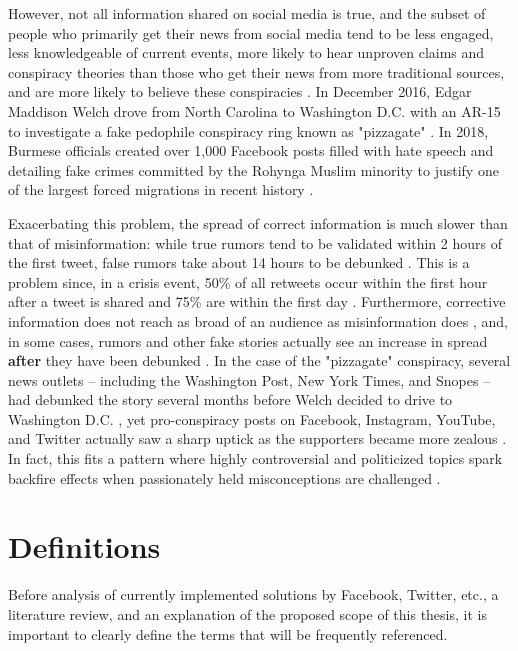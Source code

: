 \documentclass[NETN,manuscript]{stjour-new}
\begin{document}
However, not all information shared on social media is true, and the subset of people who primarily get their news from social media tend to be less engaged, less knowledgeable of current events, more likely to hear unproven claims and conspiracy theories than those who get their news from more traditional sources, and are more likely to believe these conspiracies \citep{mitchell2020americans}. In December 2016, Edgar Maddison Welch drove from North Carolina to Washington D.C. with an AR-15 to investigate a fake pedophile conspiracy ring known as "pizzagate" \citep{goldman2016comet}. In 2018, Burmese officials created over 1,000 Facebook posts filled with hate speech and detailing fake crimes committed by the Rohynga Muslim minority to justify one of the largest forced migrations in recent history \citep{subedar2018country}.

Exacerbating this problem, the spread of correct information is much slower than that of misinformation: while true rumors tend to be validated within 2 hours of the first tweet, false rumors take about 14 hours to be debunked \citep{zubiaga2016analysing,shao2016hoaxy}. This is a problem since, in a crisis event, 50\% of all retweets occur within the first hour after a tweet is shared and 75\% are within the first day \citep{kwak2010twitter}. Furthermore, corrective information does not reach as broad of an audience as misinformation does \citep{maddock2015characterizing, vosoughi2018spread}, and, in some cases, rumors and other fake stories actually see an increase in spread \textbf{after} they have been debunked \citep{starbird2014rumors}. In the case of the "pizzagate" conspiracy, several news outlets -- including the Washington Post, New York Times, and Snopes -- had debunked the story several months before Welch decided to drive to Washington D.C. \citep{kang2016fake,lacapria2016fact,board_2016}, yet pro-conspiracy posts on Facebook, Instagram, YouTube, and Twitter actually saw a sharp uptick as the supporters became more zealous \citep{kang2016washington}. In fact, this fits a pattern where highly controversial and politicized topics spark backfire effects when passionately held misconceptions are challenged \citep{gollust2009polarizing,nyhan2010corrections,nyhan2013hazards,redlawsk2010affective,schaffner2016misinformation,hart2012boomerang}.

\section{Definitions}
\label{Definitions}
Before analysis of currently implemented solutions by Facebook, Twitter, etc., a literature review, and an explanation of the proposed scope of this thesis, it is important to clearly define the terms that will be frequently referenced.
\end{document}

